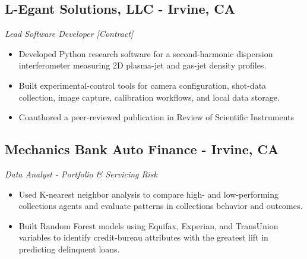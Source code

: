 \documentclass[11pt,a4paper]{article}
\newenvironment{myitemize}
{ \begin{itemize}[label={--}, leftmargin=*]
		\setlength{\itemsep}{0pt}
		\setlength{\parskip}{0pt}
		\setlength{\parsep}{0pt}     }
	{ \end{itemize}                  }
\begin{document}
	\subsection*{L-Egant Solutions, LLC - Irvine, CA \hfill
					\vspace{-1mm} %
		  }
	\vspace{-1.5mm} %
	\textit{Lead Software Developer [Contract]}
	\vspace{-2.5mm} %
\begin{myitemize}
	\item Developed Python research software for a second-harmonic dispersion interferometer measuring 2D plasma-jet and gas-jet density profiles.
	\item Built experimental-control tools for camera configuration, shot-data collection, image capture, calibration workflows, and local data storage.
	\item Coauthored a peer-reviewed publication in Review of Scientific Instruments
	
\end{myitemize}
		\vspace{-6mm} %
	\subsection*{Mechanics Bank Auto Finance - Irvine, CA \hfill
					\vspace{-1mm} %
		  }
	\vspace{-1.5mm} %
	\textit{Data Analyst - Portfolio \& Servicing Risk}
	\vspace{-2.5mm} %
	\begin{myitemize}
		\item Used K-nearest neighbor analysis to compare high- and low-performing collections agents and evaluate patterns in collections behavior and outcomes.
		\item Built Random Forest models using Equifax, Experian, and TransUnion variables to identify credit-bureau attributes with the greatest lift in predicting delinquent loans.

\end{myitemize}
\vspace{-6mm} %
\end{document}
